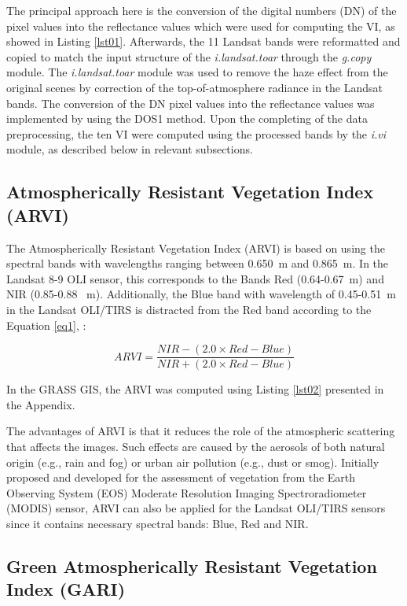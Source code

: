 \documentclass[jmse,article,submit,pdftex,moreauthors]{Definitions/mdpi}
\begin{document}
The principal approach here is the conversion of the digital numbers (DN) of the pixel values into the reflectance values which were used for computing the VI, as showed in Listing \ref{lst01}. Afterwards, the 11 Landsat bands were reformatted and copied to match the input structure of the \emph{i.landsat.toar} through the \emph{g.copy} module. The \emph{i.landsat.toar} module was used to remove the haze effect from the original scenes by correction of the top-of-atmosphere radiance in the Landsat bands. The conversion of the DN pixel values into the reflectance values was implemented by using the DOS1 method. Upon the completing of the data preprocessing, the ten VI were computed using the processed bands by the \emph{i.vi} module, as described below in relevant subsections. 

\subsection{Atmospherically Resistant Vegetation Index (ARVI)}

The Atmospherically Resistant Vegetation Index (ARVI) is based on using the spectral bands with wavelengths ranging between 0.650~{\textmu}m and 0.865~{\textmu}m. In the Landsat 8-9 OLI sensor, this corresponds to the Bands Red (0.64-0.67~{\textmu}m) and NIR (0.85-0.88 ~{\textmu}m). Additionally, the Blue band with wavelength of 0.45-0.51~{\textmu}m in the Landsat OLI/TIRS is distracted from the Red band according to the Equation \ref{eq1}, \cite{134076,HUETE1997440}:

\begin{equation}\label{eq1}
	ARVI = \frac{NIR - (2.0\times Red - Blue)}{NIR + (2.0\times Red - Blue)}
\end{equation}

In the GRASS GIS, the ARVI was computed using Listing \ref{lst02} presented in the Appendix. 

The advantages of ARVI is that it reduces the role of the atmospheric scattering that affects the images. Such effects are caused by the aerosols of both natural origin (e.g., rain and fog) or urban air pollution (e.g., dust or smog). Initially proposed and developed for the assessment of vegetation from the Earth Observing System (EOS) Moderate Resolution Imaging Spectroradiometer (MODIS) sensor, ARVI can also be applied for the Landsat OLI/TIRS sensors since it contains necessary spectral bands: Blue, Red and NIR.
\subsection{Green Atmospherically Resistant Vegetation Index (GARI)}
\end{document}
